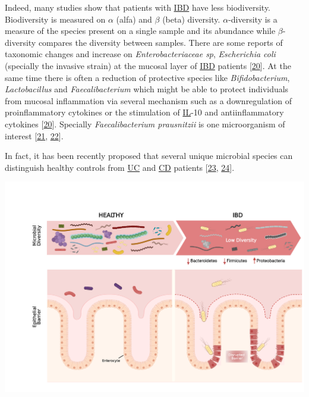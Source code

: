 \documentclass[
  12pt,
  a4paper,
  twoside,
  openright]{book}
\let\origfigure\figure
\let\endorigfigure\endfigure
\renewenvironment{figure}[1][2] {
    \expandafter\origfigure\expandafter[!htbp]
} {
    \endorigfigure
}
\begin{document}
Indeed, many studies show that patients with \protect\hyperlink{acronyms_IBD}{IBD} have less biodiversity.
Biodiversity is measured on \(\alpha\) (alfa) and \(\beta\) (beta) diversity.
\(\alpha\)-diversity is a measure of the species present on a single sample and its abundance while \(\beta\)-diversity compares the diversity between samples.
There are some reports of taxonomic changes and increase on \emph{Enterobacteriaceae sp}, \emph{Escherichia coli} (specially the invasive strain) at the mucosal layer of \protect\hyperlink{acronyms_IBD}{IBD} patients {[}\protect\hyperlink{ref-ott2004}{20}{]}.
At the same time there is often a reduction of protective species like \emph{Bifidobacterium}, \emph{Lactobacillus} and \emph{Faecalibacterium} which might be able to protect individuals from mucosal inflammation via several mechanism such as a downregulation of proinflammatory cytokines or the stimulation of \protect\hyperlink{acronyms_IL}{IL}-10 and antiinflammatory cytokines {[}\protect\hyperlink{ref-ott2004}{20}{]}.
Specially \emph{Faecalibacterium prausnitzii} is one microorganism of interest {[}\protect\hyperlink{ref-kostic2014}{21}, \protect\hyperlink{ref-sender2016}{22}{]}.

In fact, it has been recently proposed that several unique microbial species can distinguish healthy controls from \protect\hyperlink{acronyms_UC}{UC} and \protect\hyperlink{acronyms_CD}{CD} patients {[}\protect\hyperlink{ref-sankarasubramanian2020}{23}, \protect\hyperlink{ref-lopez-siles2014}{24}{]}.

\begin{figure}
\includegraphics[width=1\linewidth]{images/tesis_AM_Figure2} \caption[Microbial composition of the gut.]{Microbial composition of the gut. On the left healthy gut is represented as having a high microbiome diversity and no damage on the epithelial barrier. On the right the IBD gut were microbiome diversity is lower and some bacteria is in physical contact with the damaged epithelium. Adapted with permission from Mayorgas' 2021.}\label{fig:composition}
\end{figure}
\end{document}
